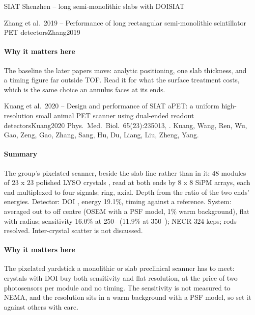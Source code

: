 \begin{programnote}{SIAT Shenzhen -- long semi-monolithic slabs with DOI}{SIAT}
\begin{papernote}{Zhang et al.\ 2019 -- Performance of long rectangular semi-monolithic scintillator PET detectors}{Zhang2019}
\paragraph{Why it matters here}
The baseline the later papers move: analytic positioning, one slab thickness,
and a timing figure far outside TOF. Read it for what the surface treatment
costs, which is the same choice an annulus faces at its ends.

\end{papernote}

\begin{papernote}{Kuang et al.\ 2020 -- Design and performance of SIAT aPET: a uniform high-resolution small animal PET scanner using dual-ended readout detectors}{Kuang2020}
Phys.\ Med.\ Biol.\ 65(23):235013, . Kuang,
Wang, Ren, Wu, Gao, Zeng, Gao, Zhang, Sang, Hu, Du, Liang, Liu, Zheng, Yang.

\paragraph{Summary}
The group's pixelated scanner, beside the slab line rather than in it: 48
modules of 23 x 23 polished LYSO crystals , read at
both ends by 8 x 8 SiPM arrays, each end multiplexed to four signals; 
ring,  axial. Depth from the ratio of the two ends' energies.
Detector: DOI , energy 19.1\%, timing  against a reference.
System:  averaged out to  off centre (OSEM with a PSF model,
1\% warm background), flat with radius; sensitivity 16.0\% at 250--
(11.9\% at 350--); NECR 324 kcps;  rods resolved. Inter-crystal
scatter is not discussed.

\paragraph{Why it matters here}
The pixelated yardstick a monolithic or slab preclinical scanner has to meet:
 crystals with  DOI buy both sensitivity and flat resolution, at
the price of two photosensors per module and no timing. The sensitivity is not
measured to NEMA, and the resolution sits in a warm background with a PSF
model, so set it against others with care.


\end{papernote}
\end{programnote}
